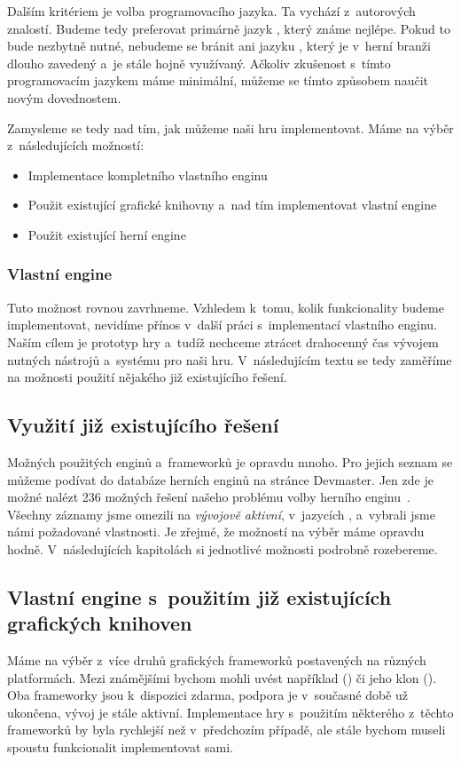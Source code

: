 Dalším kritériem je volba programovacího jazyka. Ta vychází z~autorových znalostí. Budeme tedy preferovat primárně jazyk \CS{}, který známe nejlépe. Pokud to bude nezbytně nutné, nebudeme se bránit ani jazyku \CPP{}, který je v~herní branži dlouho zavedený a~je stále hojně využívaný. Ačkoliv zkušenost s~tímto programovacím jazykem máme minimální, můžeme se tímto způsobem naučit novým dovednostem.


Zamysleme se tedy nad tím, jak můžeme naši hru implementovat. Máme na výběr z~následujících možností:
\begin{itemize}
	\item Implementace kompletního vlastního enginu
	\item Použit existující grafické knihovny a~nad tím implementovat vlastní engine
	\item Použit existující herní engine
\end{itemize}

\subsubsection{Vlastní engine}
Tuto možnost rovnou zavrhneme. Vzhledem k~tomu, kolik funkcionality budeme implementovat, nevidíme přínos v~další práci s~implementací vlastního enginu. Naším cílem je prototyp hry a~tudíž nechceme ztrácet drahocenný čas vývojem nutných nástrojů a~systému pro naši hru. V~následujícím textu se tedy zaměříme na možnosti použití nějakého již existujícího řešení.


\subsection{Využití již existujícího řešení}
\label{subsec:existingEngine}
Možných použitých enginů a~frameworků je opravdu mnoho. Pro jejich seznam se můžeme podívat do databáze herních enginů na stránce Devmaster. Jen zde je možné nalézt 236 možných řešení našeho problému volby herního enginu~\citep{engines_list}. Všechny záznamy jsme omezili na \textit{vývojově aktivní}, v~jazycích \CS{}, \CPP{} a~vybrali jsme námi požadované vlastnosti.
Je zřejmé, že možností na výběr máme opravdu hodně. V~následujících kapitolách si jednotlivé možnosti podrobně rozebereme.




\subsection{Vlastní engine s~použitím již existujících grafických knihoven}
Máme na výběr z~více druhů grafických frameworků postavených na různých platformách. Mezi známějšími bychom mohli uvést například \XNA{} (\CS{}) či jeho klon \MG{} (\CS{}). Oba frameworky jsou k~dispozici zdarma, podpora \XNA{} je v~současné době už ukončena, vývoj \MG{} je stále aktivní. Implementace hry s~použitím některého z~těchto frameworků by byla rychlejší než v~předchozím případě, ale stále bychom museli spoustu funkcionalit implementovat sami. 

